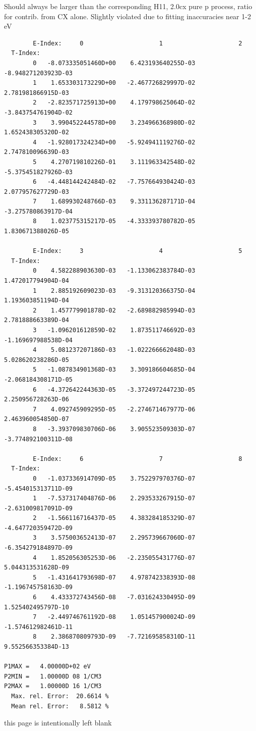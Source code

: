 \documentclass[12pt,dvipdfmx]{article}
\begin{document}
Should always be larger than the corresponding H11, 2.0cx pure p process, ratio for contrib. from CX alone.
Slightly violated due to fitting inaccuracies near 1-2 eV
\begin{small}\begin{verbatim}
        E-Index:     0                     1                     2
  T-Index:
        0   -8.073335051460D+00    6.423193640255D-03   -8.948271203923D-03
        1    1.653303173229D+00   -2.467726829997D-02    2.781981866915D-03
        2   -2.823571725913D+00    4.179798625064D-02   -3.843754761904D-02
        3    3.990452244578D+00    3.234966368980D-02    1.652438305320D-02
        4   -1.928017324234D+00   -5.924941119276D-02    2.747810096639D-03
        5    4.270719810226D-01    3.111963342548D-02   -5.375451827926D-03
        6   -4.448144242484D-02   -7.757664930424D-03    2.077957627729D-03
        7    1.689930248766D-03    9.331136287171D-04   -3.275780863917D-04
        8    1.023775315217D-05   -4.333393780782D-05    1.830671388026D-05

        E-Index:     3                     4                     5
  T-Index:
        0    4.582288903630D-03   -1.133062383784D-03    1.472017794904D-04
        1    2.885192609023D-03   -9.313120366375D-04    1.193603851194D-04
        2    1.457779901878D-02   -2.689882985994D-03    2.781888663389D-04
        3   -1.096201612859D-02    1.873511746692D-03   -1.169697988538D-04
        4    5.081237207186D-03   -1.022266662048D-03    5.028620238286D-05
        5   -1.087834901368D-03    3.309186604685D-04   -2.068184308171D-05
        6   -4.372642244363D-05   -3.372497244723D-05    2.250956728263D-06
        7    4.092745909295D-05   -2.274671467977D-06    2.463960054850D-07
        8   -3.393709830706D-06    3.905523509303D-07   -3.774892100311D-08

        E-Index:     6                     7                     8
  T-Index:
        0   -1.037336914709D-05    3.752297970376D-07   -5.454015313711D-09
        1   -7.537317404876D-06    2.293533267915D-07   -2.631009817091D-09
        2   -1.566116716437D-05    4.383284185329D-07   -4.647720359472D-09
        3    3.575003652413D-07    2.295739667060D-07   -6.354279184897D-09
        4    1.852056305253D-06   -2.235055431776D-07    5.044313531628D-09
        5   -1.431641793698D-07    4.978742338393D-08   -1.196745758163D-09
        6    4.433372743456D-08   -7.031624330495D-09    1.525402495797D-10
        7   -2.449746761192D-08    1.051457900024D-09   -1.574612982461D-11
        8    2.386870809793D-09   -7.721695858310D-11    9.552566353384D-13

P1MAX =   4.00000D+02 eV
P2MIN =   1.00000D 08 1/CM3
P2MAX =   1.00000D 16 1/CM3
  Max. rel. Error:  20.6614 %
  Mean rel. Error:   8.5812 %

\end{verbatim}\end{small}
\newpage
this page is intentionally left blank
\texttt{}
\newpage
\end{document}
